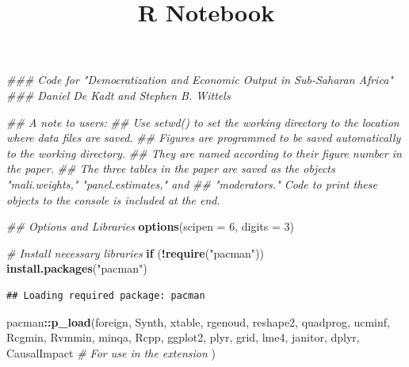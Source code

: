 \documentclass[]{article}
\title{R Notebook}
\author{}
\date{}
\newenvironment{Shaded}{\begin{snugshade}}{\end{snugshade}}
\newcommand{\CommentTok}[1]{\textcolor[rgb]{0.56,0.35,0.01}{\textit{#1}}}
\newcommand{\ControlFlowTok}[1]{\textcolor[rgb]{0.13,0.29,0.53}{\textbf{#1}}}
\newcommand{\DataTypeTok}[1]{\textcolor[rgb]{0.13,0.29,0.53}{#1}}
\newcommand{\DecValTok}[1]{\textcolor[rgb]{0.00,0.00,0.81}{#1}}
\newcommand{\KeywordTok}[1]{\textcolor[rgb]{0.13,0.29,0.53}{\textbf{#1}}}
\newcommand{\NormalTok}[1]{#1}
\newcommand{\OperatorTok}[1]{\textcolor[rgb]{0.81,0.36,0.00}{\textbf{#1}}}
\newcommand{\StringTok}[1]{\textcolor[rgb]{0.31,0.60,0.02}{#1}}
\begin{document}
\maketitle

\begin{Shaded}
\begin{Highlighting}[]
\CommentTok{### Code for "Democratization and Economic Output in Sub-Saharan Africa"}
\CommentTok{### Daniel De Kadt and Stephen B. Wittels}

\CommentTok{## A note to users:}
\CommentTok{## Use setwd() to set the working directory to the location where data files are saved. }
\CommentTok{## Figures are programmed to be saved automatically to the working directory.}
\CommentTok{## They are named according to their figure number in the paper.}
\CommentTok{## The three tables in the paper are saved as the objects "mali.weights," "panel.estimates," and}
\CommentTok{## "moderators." Code to print these objects to the console is included at the end.}


\CommentTok{## Options and Libraries}
\KeywordTok{options}\NormalTok{(}\DataTypeTok{scipen =} \DecValTok{6}\NormalTok{, }\DataTypeTok{digits =} \DecValTok{3}\NormalTok{)}

\CommentTok{# Install necessary libraries}
\ControlFlowTok{if}\NormalTok{ (}\OperatorTok{!}\KeywordTok{require}\NormalTok{(}\StringTok{"pacman"}\NormalTok{)) }\KeywordTok{install.packages}\NormalTok{(}\StringTok{"pacman"}\NormalTok{)}
\end{Highlighting}
\end{Shaded}

\begin{verbatim}
## Loading required package: pacman
\end{verbatim}

\begin{Shaded}
\begin{Highlighting}[]
\NormalTok{pacman}\OperatorTok{::}\KeywordTok{p_load}\NormalTok{(foreign, }
\NormalTok{  Synth, }
\NormalTok{  xtable, }
\NormalTok{  rgenoud, }
\NormalTok{  reshape2, }
\NormalTok{  quadprog, }
\NormalTok{  ucminf, }
\NormalTok{  Rcgmin, }
\NormalTok{  Rvmmin, }
\NormalTok{  minqa, }
\NormalTok{  Rcpp, }
\NormalTok{  ggplot2, }
\NormalTok{  plyr, }
\NormalTok{  grid, }
\NormalTok{  lme4,}
\NormalTok{  janitor,}
\NormalTok{  dplyr,}
\NormalTok{  CausalImpact  }\CommentTok{# For use in the extension}
\NormalTok{)}
\end{Highlighting}
\end{Shaded}
\end{document}
